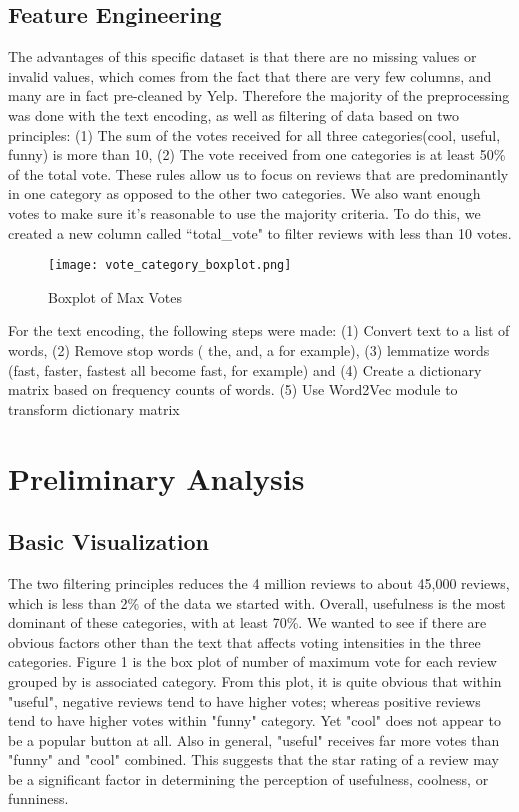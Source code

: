 \documentclass{article}
\begin{document}
\subsection{Feature Engineering}
The advantages of this specific dataset is that there are no missing values or invalid values, which comes from the fact that there are very few columns, and many are in fact pre-cleaned by Yelp. Therefore the majority of the preprocessing was done with the text encoding, as well as filtering of data based on two principles: (1) The sum of the votes received for all three categories(cool, useful, funny) is more than 10, (2) The vote received from one categories is at least 50\% of the total vote. These rules allow us to focus on reviews that are predominantly in one category as opposed to the other two categories. We also want enough votes to make sure it's reasonable to use the majority criteria. To do this, we created a new column called “total\_vote" to filter reviews with less than 10 votes. \\

\begin{wrapfigure}{r}{0.4\textwidth}
 	\centerline{\texttt{[image: vote\_category\_boxplot.png]}}
  \caption{Boxplot of Max Votes}
\end{wrapfigure}

For the text encoding, the following steps were made: (1) Convert text to a list of words, (2) Remove stop words ( the, and, a for example), (3) lemmatize words (fast, faster, fastest all become fast, for example) and (4) Create a dictionary matrix based on frequency counts of words. (5) Use Word2Vec module to transform dictionary matrix


\section{Preliminary Analysis}
\subsection{Basic Visualization}
The two filtering principles reduces the 4 million reviews to about 45,000 reviews, which is less than 2\% of the data we started with. Overall, usefulness is the most dominant of these categories, with at least 70\%. We wanted to see if there are obvious factors other than the text that affects voting intensities in the three categories. Figure 1 is the box plot of number of maximum vote for each review grouped by is associated category. From this plot, it is quite obvious that within "useful", negative reviews tend to have higher votes; whereas positive reviews tend to have higher votes within "funny" category. Yet "cool" does not appear to be a popular button at all. Also in general, "useful" receives far more votes than "funny" and "cool" combined. This suggests that the star rating of a review may be a significant factor in determining the perception of usefulness, coolness, or funniness. 
\end{document}

